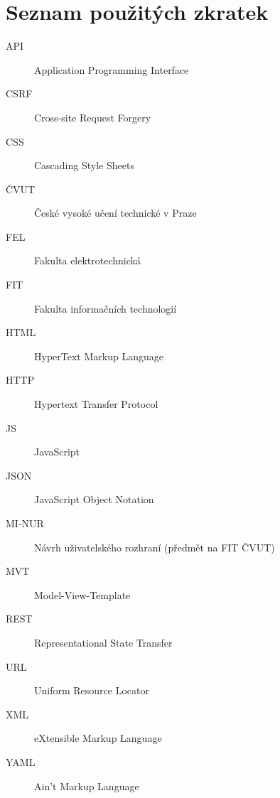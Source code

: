 \chapter{Seznam použitých zkratek}
\begin{description}
	\item[API] Application Programming Interface
	\item[CSRF] Cross-site Request Forgery
	\item[CSS] Cascading Style Sheets
	\item[ČVUT] České vysoké učení technické v Praze
	\item[FEL] Fakulta elektrotechnická
	\item[FIT] Fakulta informačních technologií
	\item[HTML] HyperText Markup Language
	\item[HTTP] Hypertext Transfer Protocol
	\item[JS] JavaScript
	\item[JSON] JavaScript Object Notation
	\item[MI-NUR] Návrh uživatelského rozhraní (předmět na FIT ČVUT)
	\item[MVT] Model-View-Template
	\item[REST] Representational State Transfer
	\item[URL] Uniform Resource Locator
	\item[XML] eXtensible Markup Language
	\item[YAML] Ain't Markup Language
\end{description}
